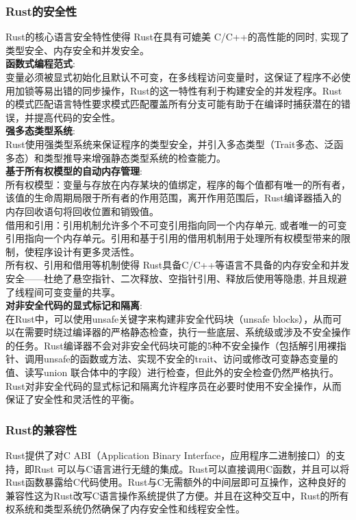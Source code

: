 \documentclass{article}
\begin{document}
\subsubsection{Rust的安全性}
Rust的核心语言安全特性\supercite{ref5}使得 Rust在具有可媲美 C/C++的高性能的同时, 实现了类型安全、内存安全和并发安全。\\
\textbf{函数式编程范式}:\\
变量必须被显式初始化且默认不可变，在多线程访问变量时，这保证了程序不必使用加锁等易出错的同步操作，Rust的这一特性有利于构建安全的并发程序。Rust的模式匹配语言特性要求模式匹配覆盖所有分支可能有助于在编译时捕获潜在的错误，并提高代码的安全性。\\
\textbf{强多态类型系统}:\\
Rust使用强类型系统来保证程序的类型安全，并引入多态类型（Trait多态\supercite{ref14}、泛函多态\supercite{ref15}）和类型推导来增强静态类型系统的检查能力。\\
\textbf{基于所有权模型的自动内存管理}:\\
所有权模型：变量与存放在内存某块的值绑定，程序的每个值都有唯一的所有者，该值的生命周期局限于所有者的作用范围，离开作用范围后，Rust编译器插入的内存回收语句将回收位置和销毁值。\supercite{ref7}\\
借用和引用：引用机制允许多个不可变引用指向同一个内存单元, 或者唯一的可变引用指向一个内存单元。引用和基于引用的借用机制用于处理所有权模型带来的限制，使程序设计有更多灵活性。\supercite{ref8}\\
所有权、引用和借用等机制使得 Rust具备C/C++等语言不具备的内存安全和并发安全——杜绝了悬空指针、二次释放、空指针引用、释放后使用等隐患, 并且规避了线程间可变变量的共享。\\
\textbf{对非安全代码的显式标记和隔离}:\\
在Rust中，可以使用unsafe关键字来构建非安全代码块（unsafe blocks），从而可以在需要时绕过编译器的严格静态检查，执行一些底层、系统级或涉及不安全操作的任务。Rust编译器不会对非安全代码块可能的5种不安全操作（包括解引用裸指针、调用unsafe的函数或方法、实现不安全的trait、访问或修改可变静态变量的值、读写union 联合体中的字段）进行检查，但此外的安全检查仍然严格执行。\\
Rust对非安全代码的显式标记和隔离允许程序员在必要时使用不安全操作，从而保证了安全性和灵活性的平衡。
\subsubsection{Rust的兼容性}
Rust提供了对C ABI（Application Binary Interface，应用程序二进制接口）的支持，即Rust 可以与C语言进行无缝的集成。Rust可以直接调用C函数，并且可以将Rust函数暴露给C代码使用\supercite{ref16}。Rust与C无需额外的中间层即可互操作，这种良好的兼容性这为Rust改写C语言操作系统提供了方便。并且在这种交互中，Rust的所有权系统和类型系统仍然确保了内存安全性和线程安全性。
\end{document}
